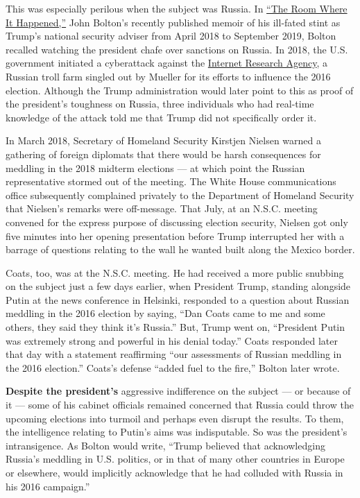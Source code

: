 This was especially perilous when the subject was Russia. In
\href{https://www.nytimes.com/2020/06/17/books/review-room-where-it-happened-john-bolton-memoir.html}{``The
Room Where It Happened,''} John Bolton's recently published memoir of
his ill-fated stint as Trump's national security adviser from April 2018
to September 2019, Bolton recalled watching the president chafe over
sanctions on Russia. In 2018, the U.S. government initiated a
cyberattack against the
\href{https://www.nytimes.com/2015/06/07/magazine/the-agency.html}{Internet
Research Agency}, a Russian troll farm singled out by Mueller for its
efforts to influence the 2016 election. Although the Trump
administration would later point to this as proof of the president's
toughness on Russia, three individuals who had real-time knowledge of
the attack told me that Trump did not specifically order it.

In March 2018, Secretary of Homeland Security Kirstjen Nielsen warned a
gathering of foreign diplomats that there would be harsh consequences
for meddling in the 2018 midterm elections --- at which point the
Russian representative stormed out of the meeting. The White House
communications office subsequently complained privately to the
Department of Homeland Security that Nielsen's remarks were off-message.
That July, at an N.S.C. meeting convened for the express purpose of
discussing election security, Nielsen got only five minutes into her
opening presentation before Trump interrupted her with a barrage of
questions relating to the wall he wanted built along the Mexico border.

Coats, too, was at the N.S.C. meeting. He had received a more public
snubbing on the subject just a few days earlier, when President Trump,
standing alongside Putin at the news conference in Helsinki, responded
to a question about Russian meddling in the 2016 election by saying,
``Dan Coats came to me and some others, they said they think it's
Russia.'' But, Trump went on, ``President Putin was extremely strong and
powerful in his denial today.'' Coats responded later that day with a
statement reaffirming ``our assessments of Russian meddling in the 2016
election.'' Coats's defense ``added fuel to the fire,'' Bolton later
wrote.

\textbf{Despite the president's} aggressive indifference on the subject
--- or because of it --- some of his cabinet officials remained
concerned that Russia could throw the upcoming elections into turmoil
and perhaps even disrupt the results. To them, the intelligence relating
to Putin's aims was indisputable. So was the president's intransigence.
As Bolton would write, ``Trump believed that acknowledging Russia's
meddling in U.S. politics, or in that of many other countries in Europe
or elsewhere, would implicitly acknowledge that he had colluded with
Russia in his 2016 campaign.''


